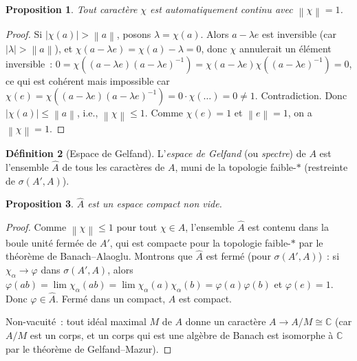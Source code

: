 \documentclass[a4paper,12pt]{book}
\newcommand{\C}{\mathbb{C}}
\newcommand{\norm}[1]{\left\| #1 \right\|}
\newcommand{\abs}[1]{\left| #1 \right|}
\theoremstyle{definition}
\newtheorem{definition}{Définition}[chapter]
\theoremstyle{plain}
\newtheorem{proposition}[definition]{Proposition}
\theoremstyle{remark}
\begin{document}
\begin{proposition}
\label{prop:caractere-continu}
Tout caractère $\chi$ est automatiquement continu avec $\norm{\chi} = 1$.
\end{proposition}

\begin{proof}
Si $\abs{\chi(a)} > \norm{a}$, posons $\lambda = \chi(a)$. Alors
$a - \lambda e$ est inversible (car $\abs{\lambda} > \norm{a}$), et
$\chi(a - \lambda e) = \chi(a) - \lambda = 0$, donc $\chi$ annulerait un élément
inversible~: $0 = \chi((a-\lambda e)(a-\lambda e)^{-1}) = \chi(a - \lambda e)\chi((a-\lambda e)^{-1}) = 0$,
ce qui est cohérent mais impossible car
$\chi(e) = \chi((a-\lambda e)(a-\lambda e)^{-1}) = 0 \cdot \chi(\ldots) = 0 \neq 1$.
Contradiction. Donc $\abs{\chi(a)} \le \norm{a}$, i.e., $\norm{\chi} \le 1$. Comme
$\chi(e) = 1$ et $\norm{e} = 1$, on a $\norm{\chi} = 1$.
\end{proof}

\begin{definition}[Espace de Gelfand]
\label{def:espace-gelfand}
L'\emph{espace de Gelfand} (ou \emph{spectre}) de $A$ est l'ensemble $\hat A$ de tous les
caractères de $A$, muni de la topologie faible-$*$ (restreinte de $\sigma(A', A)$).
\end{definition}

\begin{proposition}
\label{prop:gelfand-compact}
$\hat A$ est un espace compact non vide.
\end{proposition}

\begin{proof}
Comme $\norm{\chi} \le 1$ pour tout $\chi \in \hat A$, l'ensemble $\hat A$ est contenu
dans la boule unité fermée de $A'$, qui est compacte pour la topologie faible-$*$ par le
théorème de Banach--Alaoglu. Montrons que $\hat A$
est fermé (pour $\sigma(A', A)$)~: si $\chi_\alpha \to \varphi$ dans $\sigma(A', A)$,
alors $\varphi(ab) = \lim \chi_\alpha(ab) = \lim \chi_\alpha(a)\chi_\alpha(b) = \varphi(a)\varphi(b)$
et $\varphi(e) = 1$. Donc $\varphi \in \hat A$. Fermé dans un compact, $\hat A$ est
compact.

Non-vacuité~: tout idéal maximal $M$ de $A$ donne un caractère $A \to A/M \cong \C$ (car
$A/M$ est un corps, et un corps qui est une algèbre de Banach est isomorphe à $\C$ par
le théorème de Gelfand--Mazur).
\end{proof}
\end{document}
